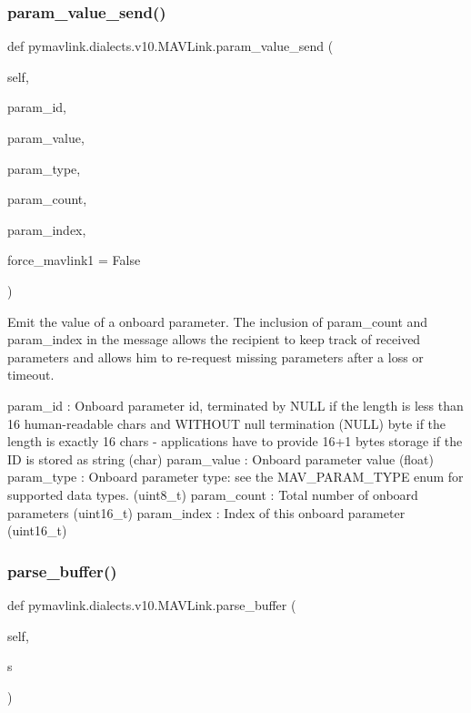 \begin{DoxyVerb}
\begin{DoxyVerb}
\begin{DoxyVerb}
\begin{DoxyVerb}
\subsubsection{\texorpdfstring{param\+\_\+value\+\_\+send()}{param\_value\_send()}}
{\footnotesize\ttfamily def pymavlink.\+dialects.\+v10.\+M\+A\+V\+Link.\+param\+\_\+value\+\_\+send (\begin{DoxyParamCaption}\item[{}]{self,  }\item[{}]{param\+\_\+id,  }\item[{}]{param\+\_\+value,  }\item[{}]{param\+\_\+type,  }\item[{}]{param\+\_\+count,  }\item[{}]{param\+\_\+index,  }\item[{}]{force\+\_\+mavlink1 = {\ttfamily False} }\end{DoxyParamCaption})}

\begin{DoxyVerb}Emit the value of a onboard parameter. The inclusion of param_count
and param_index in the message allows the recipient to
keep track of received parameters and allows him to
re-request missing parameters after a loss or timeout.

param_id                  : Onboard parameter id, terminated by NULL if the length is less than 16 human-readable chars and WITHOUT null termination (NULL) byte if the length is exactly 16 chars - applications have to provide 16+1 bytes storage if the ID is stored as string (char)
param_value               : Onboard parameter value (float)
param_type                : Onboard parameter type: see the MAV_PARAM_TYPE enum for supported data types. (uint8_t)
param_count               : Total number of onboard parameters (uint16_t)
param_index               : Index of this onboard parameter (uint16_t)\end{DoxyVerb}
 \mbox{\label{classpymavlink_1_1dialects_1_1v10_1_1MAVLink_a6e2d1bc42061390b83f5469190c0ca4a}} 
\subsubsection{\texorpdfstring{parse\+\_\+buffer()}{parse\_buffer()}}
{\footnotesize\ttfamily def pymavlink.\+dialects.\+v10.\+M\+A\+V\+Link.\+parse\+\_\+buffer (\begin{DoxyParamCaption}\item[{}]{self,  }\item[{}]{s }\end{DoxyParamCaption})}


\end{DoxyVerb}
\end{DoxyVerb}
\end{DoxyVerb}
\end{DoxyVerb}
